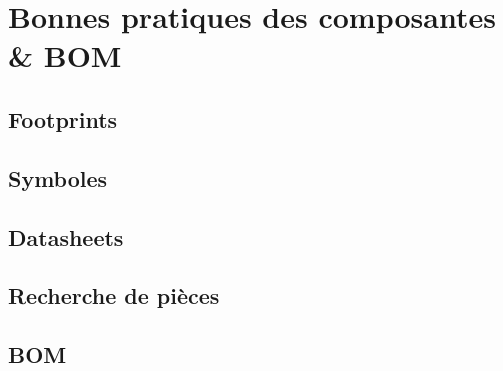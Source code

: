 

\section{Bonnes pratiques des composantes \& BOM}

\subsection{Footprints}

\subsection{Symboles}

\subsection{Datasheets}

\subsection{Recherche de pièces}

\subsection{BOM}
